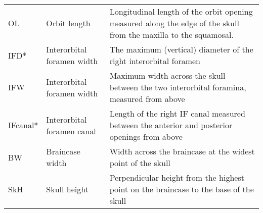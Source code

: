\begin{tabular}{lp{3.5cm}p{9.75cm}}
OL & Orbit length & Longitudinal length of the orbit opening measured along the edge of the skull from the maxilla to the squamosal. \\
IFD* & Interorbital foramen width & The maximum (vertical) diameter of the right interorbital foramen\\
IFW & Interorbital foramen width & Maximum width across the skull between the two interorbital foramina, measured from above\\
IFcanal* & Interorbital foramen canal & Length of the right IF canal measured between the anterior and posterior openings from above\\
BW & Braincase width & Width across the braincase at the widest point of the skull\\
SkH & Skull height & Perpendicular height from the highest point on the braincase to the base of the skull\\



\hline
\end{tabular}